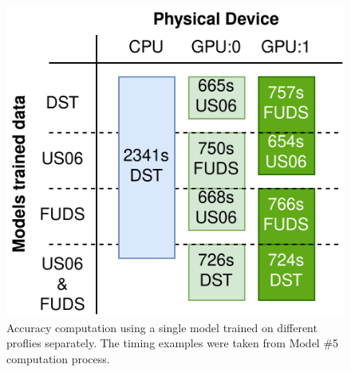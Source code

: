 \begin{figure}[ht]
    \centering
    \includegraphics[width=\columnwidth]{II_Body/images/Accuracy_Compute.png}
    \caption{Accuracy computation using a single model trained on different proflies separately. The timing examples were taken from Model \#5 computation process.}
    \label{fig:device_compute}
\end{figure}


